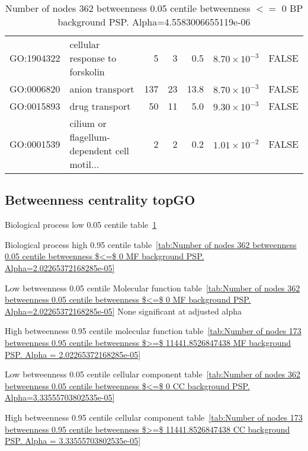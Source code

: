 \begin{table}[ht]
\begin{adjustbox}{max width=\textwidth}
\begin{tabular}{llrrrrl}
  GO:1904322 & cellular response to forskolin & 5 & 3 & 0.5 & $8.70 \times 10^{-3}$ & FALSE \\ 
  GO:0006820 & anion transport & 137 & 23 & 13.8 & $8.70 \times 10^{-3}$ & FALSE \\ 
  GO:0015893 & drug transport & 50 & 11 & 5.0 & $9.30 \times 10^{-3}$ & FALSE \\ 
  GO:0001539 & cilium or flagellum-dependent cell motil... & 2 & 2 & 0.2 & $1.01 \times 10^{-2}$ & FALSE \\ 
   \hline
\end{tabular}
\end{adjustbox}
\caption{Number of nodes 362 betweenness 0.05 centile  betweenness $<=$ 0 BP background PSP. Alpha=4.5583006655119e-06} 
\label{tab:Number of nodes 362 betweenness 0.05 centile  betweenness $<=$ 0 BP background PSP. Alpha=4.5583006655119e-06}
\end{table}



\subsection{Betweenness centrality topGO}

Biological process low 0.05 centile table~\ref{tab:Number of nodes 362 betweenness 0.05 centile  betweenness $<=$ 0 BP background PSP. Alpha=4.5583006655119e-06}

Biological process high 0.95 centile table~\ref{tab:Number of nodes 362 betweenness 0.05 centile  betweenness $<=$ 0 MF background PSP. Alpha=2.02265372168285e-05}

Low betweenness 0.05 centile Molecular function table~\ref{tab:Number of nodes 362 betweenness 0.05 centile  betweenness $<=$ 0 MF background PSP. Alpha=2.02265372168285e-05} None significant at adjusted alpha

High betweenness 0.95 centile molecular function table~\ref{tab:Number of nodes 173 betweenness 0.95 centile  betweenness $>=$ 11441.8526847438 MF background PSP. Alpha = 2.02265372168285e-05}


Low betweenness 0.05 centile cellular component table~\ref{tab:Number of nodes 362 betweenness 0.05 centile  betweenness $<=$ 0 CC background PSP. Alpha=3.33555703802535e-05}

High betweenness 0.95 centile cellular component table~\ref{tab:Number of nodes 173 betweenness 0.95 centile  betweenness $>=$ 11441.8526847438 CC background PSP. Alpha = 3.33555703802535e-05}


